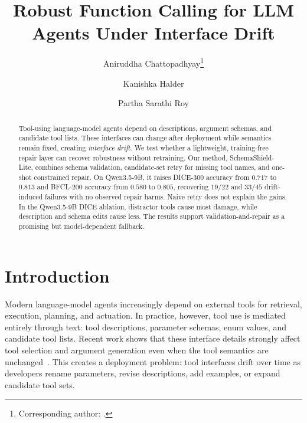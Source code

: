 \documentclass{llncs}
\newcommand{\method}{SchemaShield-Lite\xspace}
\begin{document}
\title{Robust Function Calling for LLM Agents Under Interface Drift}

\author{Aniruddha Chattopadhyay\thanks{Corresponding author:
.} \and
Kanishka Halder \and
Partha Sarathi Roy}

\maketitle

\begin{abstract}
Tool-using language-model agents depend on descriptions, argument schemas, and
candidate tool lists. These interfaces can change after deployment while semantics
remain fixed, creating \emph{interface drift}. We test whether a lightweight,
training-free repair layer can recover robustness without retraining. Our method,
\method, combines schema validation, candidate-set retry for missing tool names,
and one-shot constrained repair. On Qwen3.5-9B, it
raises DICE-300 accuracy from $0.717$ to $0.813$ and BFCL-200 accuracy from
$0.580$ to $0.805$, recovering $19/22$ and $33/45$ drift-induced failures with no
observed repair harms. Naive retry does not explain the gains. In the Qwen3.5-9B
DICE ablation, distractor tools cause most damage, while description and schema
edits cause less. The results support validation-and-repair as a promising but
model-dependent fallback.
\end{abstract}

\section{Introduction}
Modern language-model agents increasingly depend on external tools for retrieval,
execution, planning, and actuation. In practice, however, tool use is mediated
entirely through text: tool descriptions, parameter schemas, enum values, and
candidate tool lists. Recent work shows that these interface details strongly affect
tool selection and argument generation
even when the tool semantics are unchanged~\cite{guo2026rewrite,faghih2025gaming}.
This creates a deployment problem: tool interfaces drift over time as developers
rename parameters, revise descriptions, add examples, or expand candidate tool sets.
\end{document}
